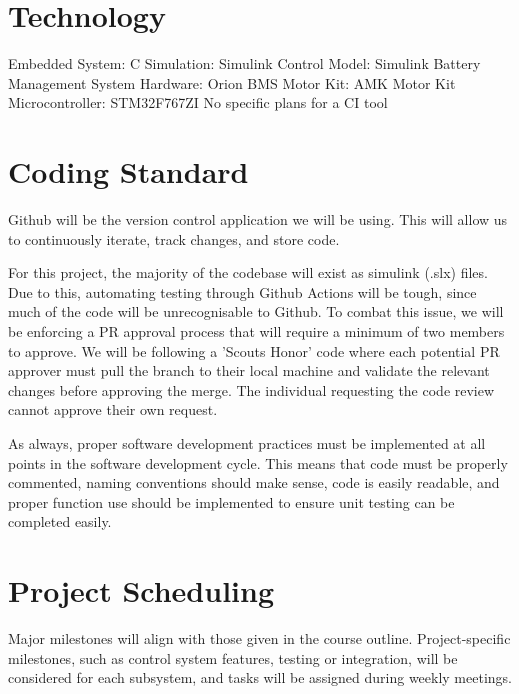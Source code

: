 \documentclass{article}
\begin{document}
\section{Technology}
Embedded System: C
Simulation: Simulink
Control Model: Simulink
Battery Management System Hardware: Orion BMS
Motor Kit: AMK Motor Kit
Microcontroller: STM32F767ZI
No specific plans for a CI tool

\section{Coding Standard}
Github will be the version control application we will be using. This will allow us 
to continuously iterate, track changes, and store code. 

For this project, the majority of the codebase will exist as simulink (.slx) files. 
Due to this, automating testing through Github Actions will be tough, since much of 
the code will be unrecognisable to Github. To combat this issue, we will be enforcing 
a PR approval process that will require a minimum of two members to approve. We will 
be following a 'Scouts Honor' code where each potential PR approver must pull the 
branch to their local machine and validate the relevant changes before approving the 
merge. The individual requesting the code review cannot approve their own request.

As always, proper software development practices must be implemented at all points 
in the software development cycle. This means that code must be properly commented, 
naming conventions should make sense, code is easily readable, and proper function 
use should be implemented to ensure unit testing can be completed easily.

\section{Project Scheduling}
Major milestones will align with those given in the course outline. Project-specific 
milestones, such as control system features, testing or integration, will be considered 
for each subsystem, and tasks will be assigned during weekly meetings.
\end{document}
